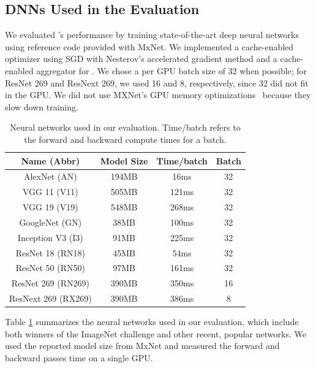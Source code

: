 \subsection{DNNs Used in the Evaluation}
We evaluated \phub{}'s performance by training state-of-the-art deep neural networks using reference code provided with MxNet. %
We implemented a cache-enabled optimizer using SGD with Nesterov's accelerated gradient method \cite{nesterov1983method} and a cache-enabled aggregator for \phub{}. We chose a per GPU batch size of 32 when possible; for ResNet 269 and ResNext 269, we used 16 and 8, respectively, since 32 did not fit in the GPU. We did not use MXNet's GPU memory optimizations~\cite{chen2016training} because they slow down training.

\begin{table}[t!]
	\centering
	\footnotesize
	\begin{tabular}{|c|c|c|c|}
		\hline 
		Name (Abbr)           & Model Size & Time/batch & Batch \\
		\hline
		AlexNet (AN)      & 194MB & 16ms &  32 \\
		\hline 
		VGG 11 (V11)       & 505MB & 121ms & 32 \\
		\hline
		VGG 19 (V19)      & 548MB & 268ms & 32 \\
		\hline
		GoogleNet (GN)   &  38MB & 100ms & 32 \\
		\hline
		Inception V3 (I3) & 91MB  & 225ms & 32 \\
		\hline
		ResNet 18 (RN18)   & 45MB & 54ms & 32 \\
		\hline
		ResNet 50 (RN50)   & 97MB & 161ms & 32 \\
		\hline  
		ResNet 269 (RN269)  & 390MB & 350ms & 16 \\
		\hline
		ResNext 269 (RX269) & 390MB & 386ms & 8 \\
		\hline
	\end{tabular}
	\caption{Neural networks used in our evaluation. Time/batch refers to the forward and backward compute times for a batch.}
	\label{table:networkCharacterization}
\end{table}


Table \ref{table:networkCharacterization} summarizes the neural networks used in our evaluation, which include both winners of the ImageNet challenge and other recent, popular networks. We used the reported model size from MxNet and measured the forward and backward passes time on a single GPU. %

